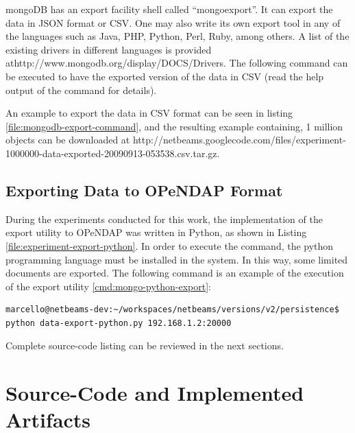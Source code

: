 mongoDB has an export facility shell called ``mongoexport''. It can export the
data in JSON format or CSV. One may also write its own export tool in any of the
languages such as Java, PHP, Python, Perl, Ruby, among others. A list of the
existing drivers in different languages is provided
athttp://www.mongodb.org/display/DOCS/Drivers. The following command can be
executed to have the exported version of the data in CSV (read the help output
of the command for details).

An example to export the data in CSV format can be seen in listing
\ref{file:mongodb-export-command}, and the resulting example containing, 1
million objects can be downloaded at
http://netbeams.googlecode.com/files/experiment-1000000-data-exported-20090913-053538.csv.tar.gz.

\subsection{Exporting Data to OPeNDAP Format}

During the experiments conducted for this work, the implementation of the
export utility to OPeNDAP was written in Python, as shown in Listing
\ref{file:experiment-export-python}. In order to execute the command, the
python programming language \cite{python} must be installed in the system. In
this way, some limited documents are exported. The following command is an
example of the execution of the export utility \ref{cmd:mongo-python-export}:

\lstset{label=cmd:mongo-python-export,caption=Query Element with specific
projection limiting the result set size}
\begin{lstlisting}
marcello@netbeams-dev:~/workspaces/netbeams/versions/v2/persistence$ python data-export-python.py 192.168.1.2:20000
\end{lstlisting}

Complete source-code listing can be reviewed in the next sections.

\newpage

\section{Source-Code and Implemented Artifacts}





